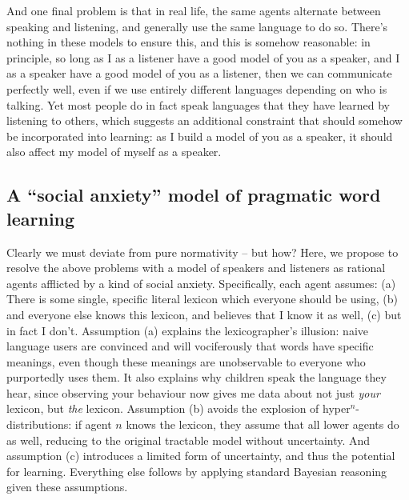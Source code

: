 \documentclass{article} %
\begin{document}
And one final problem is that in real life, the same agents alternate between speaking and listening, and generally use the same language to do so. There's nothing in these models to ensure this, and this is somehow reasonable: in principle, so long as I as a listener have a good model of you as a speaker, and I as a speaker have a good model of you as a listener, then we can communicate perfectly well, even if we use entirely different languages depending on who is talking. Yet most people do in fact speak languages that they have learned by listening to others, which suggests an additional constraint that should somehow be incorporated into learning: as I build a model of you as a speaker, it should also affect my model of myself as a speaker.

\subsection{A ``social anxiety'' model of pragmatic word learning}

Clearly we must deviate from pure normativity -- but how? Here, we propose to resolve the above problems with a model of speakers and listeners as rational agents afflicted by a kind of social anxiety. Specifically, each agent assumes: (a) There is some single, specific literal lexicon which everyone should be using, (b) and everyone else knows this lexicon, and believes that I know it as well, (c) but in fact I don't. Assumption (a) explains the lexicographer's illusion: naive language users are convinced and will vociferously that words have specific meanings, even though these meanings are unobservable to everyone who purportedly uses them. It also explains why children speak the language they hear, since observing your behaviour now gives me data about not just \textit{your} lexicon, but \textit{the} lexicon. Assumption (b) avoids the explosion of hyper$^n$-distributions: if agent $n$ knows the lexicon, they assume that all lower agents do as well, reducing to the original tractable model without uncertainty. And assumption (c) introduces a limited form of uncertainty, and thus the potential for learning. Everything else follows by applying standard Bayesian reasoning given these assumptions.
\end{document}

